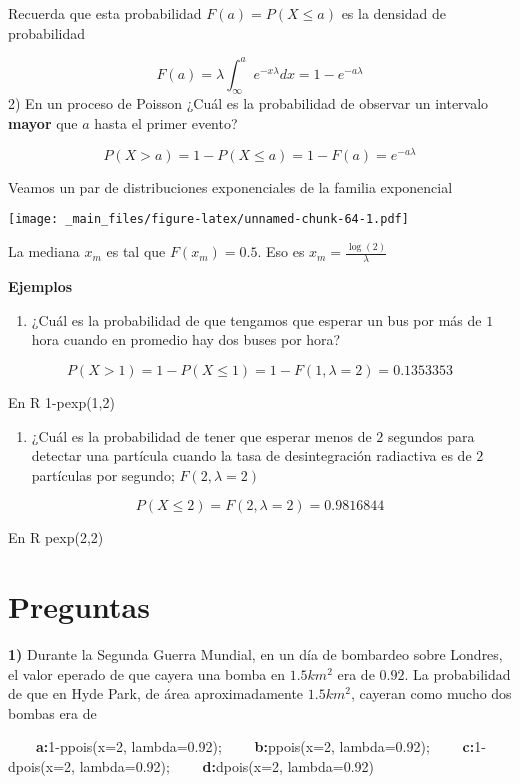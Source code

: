 \documentclass[
]{book}
\providecommand{\tightlist}{%
  \setlength{\itemsep}{0pt}\setlength{\parskip}{0pt}}
\begin{document}
Recuerda que esta probabilidad \(F(a)=P(X \leq a)\) es la densidad de probabilidad

\[F(a)=\lambda\int_\infty^ae^{-x\lambda}dx=1-e^{-a\lambda}\]
2) En un proceso de Poisson ¿Cuál es la probabilidad de observar un intervalo \textbf{mayor} que \(a\) hasta el primer evento?

\[P(X > a)=1- P(X \leq a)= 1- F(a) = e^{-a\lambda}\]

Veamos un par de distribuciones exponenciales de la familia exponencial

\texttt{[image: \_main\_files/figure-latex/unnamed-chunk-64-1.pdf]}

La mediana \(x_m\) es tal que \(F(x_m)=0.5\). Eso es \(x_m=\frac{\log(2)}{\lambda}\)

\textbf{Ejemplos}

\begin{enumerate}
\def\labelenumi{\arabic{enumi})}
\tightlist
\item
  ¿Cuál es la probabilidad de que tengamos que esperar un bus por más de \(1\) hora cuando en promedio hay dos buses por hora?
\end{enumerate}

\[P(X > 1)=1-P(X \le 1) = 1-F(1,\lambda=2)=0.1353353\]

En R 1-pexp(1,2)

\begin{enumerate}
\def\labelenumi{\arabic{enumi})}
\setcounter{enumi}{1}
\tightlist
\item
  ¿Cuál es la probabilidad de tener que esperar menos de \(2\) segundos para detectar una partícula cuando la tasa de desintegración radiactiva es de \(2\) partículas por segundo; \(F(2,\lambda=2)\)
\end{enumerate}

\[P(X\le 2)=F(2,\lambda=2)=0.9816844\]

En R pexp(2,2)

\hypertarget{preguntas-5}{%
\section{Preguntas}\label{preguntas-5}}

\textbf{1)} Durante la Segunda Guerra Mundial, en un día de bombardeo sobre Londres, el valor eperado de que cayera una bomba en \(1.5km^2\) era de \(0.92\). La probabilidad de que en Hyde Park, de área aproximadamente \(1.5km^2\), cayeran como mucho dos bombas era de

\textbf{\(\qquad\)a:}1-ppois(x=2, lambda=0.92);
\textbf{\(\qquad\)b:}ppois(x=2, lambda=0.92); \textbf{\(\qquad\)c:}1-dpois(x=2, lambda=0.92); \textbf{\(\qquad\)d:}dpois(x=2, lambda=0.92)
\end{document}
